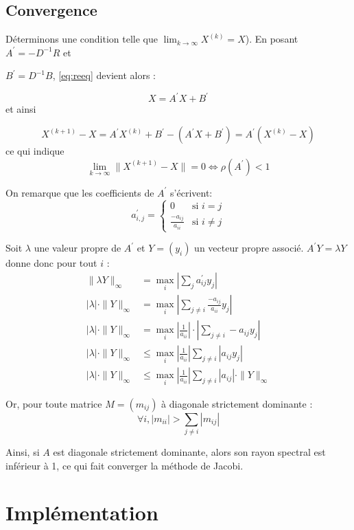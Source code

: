 \documentclass[11pt, a4paper]{article}
\begin{document}
\newpage
\subsection{Convergence}

Déterminons une condition telle que \(\lim_{k \to \infty} X^{(k)} = X\)).
En posant \( A^\prime = -D^{-1}R\) et

\( B^\prime = D^{-1}B \),
\eqref{eq:reeq} devient alors :

\[
    X = A^\prime X + B^\prime
\]
et ainsi

\[
    X^{(k+1)} - X = A^\prime X^{(k)} + B^\prime - (A^\prime X + B^\prime)
    =  A^\prime (X^{(k)} - X)
\]
ce qui indique
\[
    \lim_{k \to \infty} \| X^{(k+1)} - X \| = 0 \Leftrightarrow \rho(A^\prime) < 1
\]

On remarque que les coefficients de \( A^\prime \) s'écrivent:
\[
    a^\prime_{i,j} = \left\{
        \begin{array}{lr}
            0 & \text{si } i = j \\
            \frac{-a_{ij}}{a_{ii}} & \text{si } i \neq j
        \end{array}
    \right.
\]

Soit \( \lambda \) une valeur propre de \( A^\prime \) et \( Y = (y_i) \)
un vecteur propre associé.
\( A^\prime Y = \lambda Y \) donne donc pour tout \(i\) :
\begin{align*}
    \|\lambda Y\|_\infty &= \max_{i}| \sum_j a^\prime_{ij} y_j | \\
    |\lambda| \cdot\| Y\|_\infty &= \max_{i} | \sum_{j \neq i} \frac{-a_{ij}}{a_{ii}} y_j | \\
    |\lambda| \cdot\| Y\|_\infty &= \max_{i} |\frac{1}{a_{ii}}| \cdot | \sum_{j \neq i} -a_{ij} y_j| \\
    |\lambda| \cdot\| Y\|_\infty &\leq \max_{i}|\frac{1}{a_{ii}}| \sum_{j \neq i} |a_{ij} y_j|\\
    |\lambda| \cdot\| Y\|_\infty &\leq \max_{i}|\frac{1}{a_{ii}}| \sum_{j \neq i} |a_{ij}| \cdot\| Y\|_\infty
\end{align*}

Or, pour toute matrice \( M = (m_{ij}) \) à diagonale strictement dominante :
\[
    \forall i, |m_{ii}| > \sum_{j \neq i} |m_{ij}|
\]

Ainsi, si \( A \) est diagonale strictement dominante, alors son rayon spectral est inférieur à 1, ce qui fait converger la méthode de Jacobi.

\newpage
\section{Implémentation}
\end{document}
